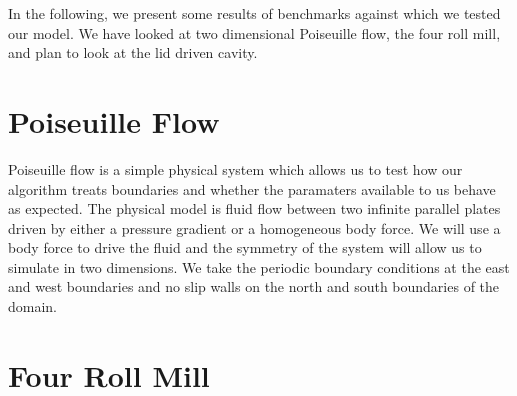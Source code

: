 In the following, we present some results of benchmarks against which we tested our model. We have looked at two dimensional Poiseuille flow, the four roll mill, and plan to look at the lid driven cavity.

\section{Poiseuille Flow}
Poiseuille flow is a simple physical system which allows us to test how our algorithm treats boundaries and whether the paramaters available to us behave as expected. The physical model is fluid flow between two infinite parallel plates driven by either a pressure gradient or a homogeneous body force. We will use a body force to drive the fluid and the symmetry of the system will allow us to simulate in two dimensions. We take the periodic boundary conditions at the east and west boundaries and no slip walls on the north and south boundaries of the domain.





\section{Four Roll Mill}